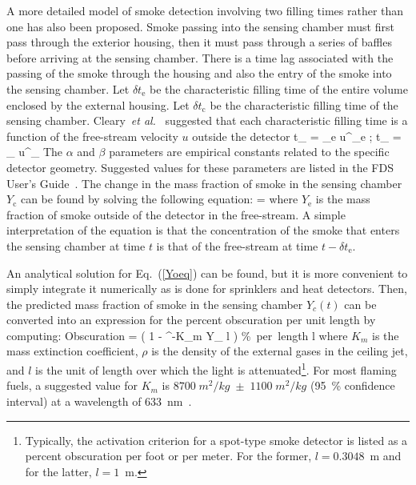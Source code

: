A more detailed model of smoke detection involving two filling times rather than one has also been proposed. Smoke passing into the sensing chamber must first pass through the exterior housing, then it must pass through a series of baffles before arriving at the sensing chamber. There is a time lag associated with the passing of the smoke through the housing and also the entry of the smoke into the sensing chamber.
Let $\delta t_\mathrm{e}$ be the characteristic filling time of the entire volume enclosed by the external housing. Let $\delta t_\mathrm{c}$ be the characteristic filling time of the sensing chamber. Cleary~{\em et al.}~\cite{Cleary:IAFSS6} suggested that each characteristic filling time is a function of the free-stream velocity $u$ outside the detector
\be
\delta t_ = \alpha_e u^{\beta_e} \quad ; \quad \delta t_ = \alpha_ u^{\beta_}
\ee
The $\alpha$ and $\beta$ parameters are empirical constants related to the specific detector geometry. Suggested values for these parameters are listed in the FDS User's Guide~\cite{FDS_Users_Guide}. The change in the mass fraction of smoke in the sensing chamber $Y_\mathrm{c}$ can be found by solving the following equation:
\be
{} =  \label{Yoeq}
\ee
where $Y_\mathrm{e}$ is the mass fraction of smoke outside of the detector in the free-stream. A simple interpretation of the equation is that the concentration of the smoke that enters the sensing chamber at time $t$ is that of the free-stream at time $t-\delta t_\mathrm{e}$.

An analytical solution for Eq.~(\ref{Yoeq}) can be found, but it is more convenient to simply integrate it numerically as is done for sprinklers and heat detectors. Then, the predicted mass fraction of smoke in the sensing chamber $Y_c(t)$ can be converted into an expression for the percent obscuration per unit length by computing:
\be
   \hbox{Obscuration}  = \left( 1 - ^{-K_m \rho Y_ l} \right)  \; \; \hbox{\% per length} \; l
\ee
where $K_m$ is the mass extinction coefficient, $\rho$ is the density of the external gases in the ceiling jet, and $l$ is the unit of length over which the light is attenuated\footnote{Typically, the activation criterion for a spot-type smoke detector is listed as a percent obscuration per foot or per meter. For the former, $l=0.3048$~m and for the latter, $l=1$~m.}. For most flaming fuels, a suggested value for $K_m$ is $8700 \; \unit{m^2/kg} \; \pm \; 1100 \;\unit{m^2/kg}$ (95~\% confidence interval) at a wavelength of 633~nm~\cite{Mulholland:F+M}.

